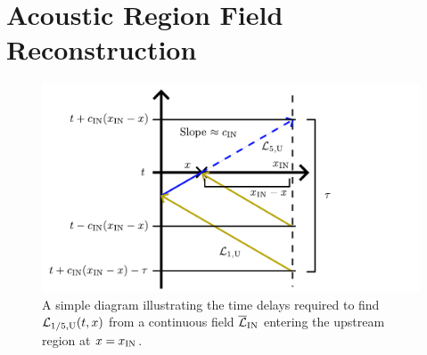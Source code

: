\section{Acoustic Region Field Reconstruction}

\begin{figure}[t]
\centering
\includegraphics[scale=0.65]{assets/imgs/inlet-adcbc-spatial-field.pdf}
\caption{A simple diagram illustrating the time delays required to find $\cl{L}_{1/5, \rm{U}}(t, x)$ from a continuous field $\overline{\cl{L}}_{\rm{IN}}$ entering the upstream region at $x = x_{\rm{IN}}$.}
\label{fig:field-reconstruction}
\end{figure}

